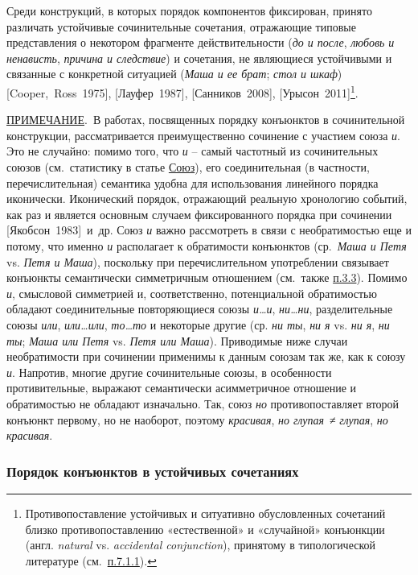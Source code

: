Среди конструкций, в которых порядок компонентов фиксирован, принято
различать устойчивые сочинительные сочетания, отражающие типовые
представления о некотором фрагменте действительности (\emph{до и после},
\emph{любовь и ненависть}, \emph{причина и следствие}) и сочетания, не
являющиеся устойчивыми и связанные с конкретной ситуацией (\emph{Маша и
ее брат}; \emph{стол и шкаф}) {[}Cooper,~Ross~1975{]},
{[}Лауфер~1987{]}, {[}Санников~2008{]}, {[}Урысон~2011{]}\footnote{Противопоставление
  устойчивых и ситуативно обусловленных сочетаний близко
  противопоставлению «естественной» и «случайной» конъюнкции (англ.
  \emph{natural} vs. \emph{accidental conjunction}), принятому в
  типологической литературе (см.~\underline{п.7.1.1}).}.

\underline{ПРИМЕЧАНИЕ}.~В работах, посвященных порядку конъюнктов в
сочинительной конструкции, рассматривается преимущественно сочинение с
участием союза \emph{и}. Это не случайно: помимо того, что \emph{и} --
самый частотный из сочинительных союзов (см.~статистику в статье
\underline{Союз}), его соединительная (в частности, перечислительная)
семантика удобна для использования линейного порядка иконически.
Иконический порядок, отражающий реальную хронологию событий, как раз и
является основным случаем фиксированного порядка при сочинении
{[}Якобсон~1983{]}~и~др. Союз \emph{и} важно рассмотреть в связи с
необратимостью еще и потому, что именно \emph{и} располагает к
обратимости конъюнктов (ср.~\emph{Маша и Петя} vs. \emph{Петя и Маша}),
поскольку при перечислительном употреблении связывает конъюнкты
семантически симметричным отношением (см.~также \underline{п.3.3}).
Помимо \emph{и}, смысловой симметрией и, соответственно, потенциальной
обратимостью обладают соединительные повторяющиеся союзы
\emph{и\ldots и}, \emph{ни\ldots ни}, разделительные союзы \emph{или},
\emph{или\ldots или}, \emph{то\ldots то} и некоторые другие (ср.
\emph{ни ты}, \emph{ни я} vs. \emph{ни я}, \emph{ни ты}; \emph{Маша или
Петя} vs. \emph{Петя или Маша}). Приводимые ниже случаи необратимости
при сочинении применимы к данным союзам так же, как к союзу \emph{и}.
Напротив, многие другие сочинительные союзы, в особенности
противительные, выражают семантически асимметричное отношение и
обратимостью не обладают изначально. Так, союз \emph{но}
противопоставляет второй конъюнкт первому, но не наоборот, поэтому
\emph{красивая}, \emph{но глупая}~≠ \emph{глупая}, \emph{но красивая}.

\hypertarget{ux43fux43eux440ux44fux434ux43eux43a-ux43aux43eux43dux44aux44eux43dux43aux442ux43eux432-ux432-ux443ux441ux442ux43eux439ux447ux438ux432ux44bux445-ux441ux43eux447ux435ux442ux430ux43dux438ux44fux445}{%
\subsubsection{Порядок конъюнктов в устойчивых
сочетаниях}\label{ux43fux43eux440ux44fux434ux43eux43a-ux43aux43eux43dux44aux44eux43dux43aux442ux43eux432-ux432-ux443ux441ux442ux43eux439ux447ux438ux432ux44bux445-ux441ux43eux447ux435ux442ux430ux43dux438ux44fux445}}


